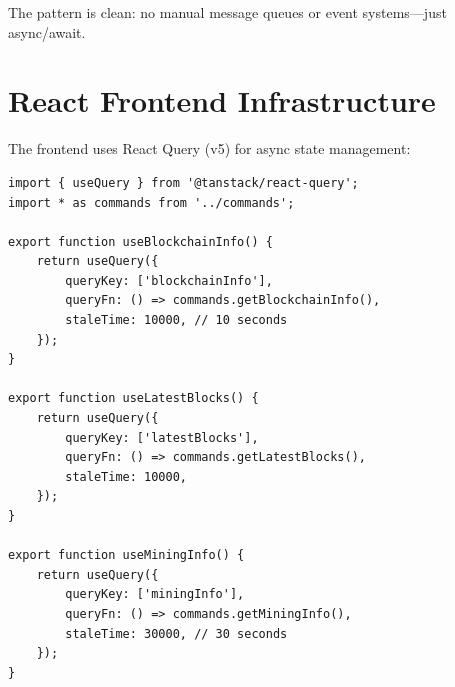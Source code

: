 The pattern is clean: no manual message queues or event systems---just async/await.

\section{React Frontend Infrastructure}
\label{sec:ch17-frontend-infra}

The frontend uses React Query (v5) for async state management:

\begin{listing}[htbp]
\caption{React Query hooks ()}
\label{lst:ch17-hooks}
\begin{verbatim}
import { useQuery } from '@tanstack/react-query';
import * as commands from '../commands';

export function useBlockchainInfo() {
    return useQuery({
        queryKey: ['blockchainInfo'],
        queryFn: () => commands.getBlockchainInfo(),
        staleTime: 10000, // 10 seconds
    });
}

export function useLatestBlocks() {
    return useQuery({
        queryKey: ['latestBlocks'],
        queryFn: () => commands.getLatestBlocks(),
        staleTime: 10000,
    });
}

export function useMiningInfo() {
    return useQuery({
        queryKey: ['miningInfo'],
        queryFn: () => commands.getMiningInfo(),
        staleTime: 30000, // 30 seconds
    });
}
\end{verbatim}
\end{listing}
